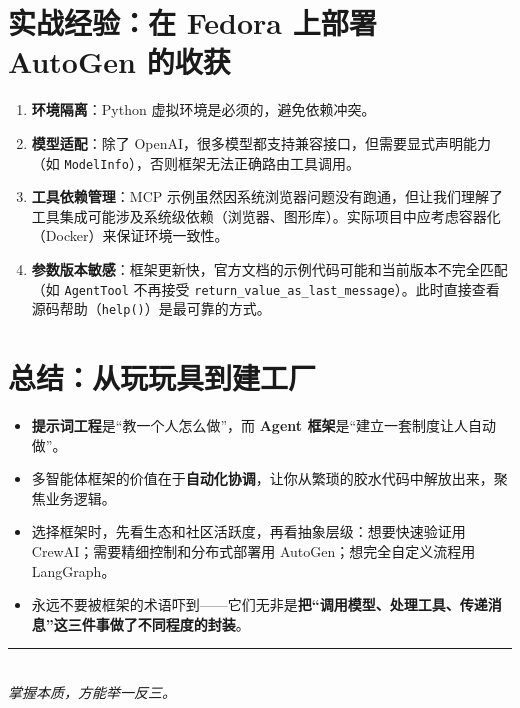\documentclass[11pt,a4paper]{article}
\begin{document}
\section{实战经验：在 Fedora 上部署 AutoGen 的收获}
\begin{enumerate}
    \item \textbf{环境隔离}：Python 虚拟环境是必须的，避免依赖冲突。
    \item \textbf{模型适配}：除了 OpenAI，很多模型都支持兼容接口，但需要显式声明能力（如 \texttt{ModelInfo}），否则框架无法正确路由工具调用。
    \item \textbf{工具依赖管理}：MCP 示例虽然因系统浏览器问题没有跑通，但让我们理解了工具集成可能涉及系统级依赖（浏览器、图形库）。实际项目中应考虑容器化（Docker）来保证环境一致性。
    \item \textbf{参数版本敏感}：框架更新快，官方文档的示例代码可能和当前版本不完全匹配（如 \texttt{AgentTool} 不再接受 \texttt{return\_value\_as\_last\_message}）。此时直接查看源码帮助（\texttt{help()}）是最可靠的方式。
\end{enumerate}

\section{总结：从玩玩具到建工厂}
\begin{itemize}
    \item \textbf{提示词工程}是“教一个人怎么做”，而 \textbf{Agent 框架}是“建立一套制度让人自动做”。
    \item 多智能体框架的价值在于\textbf{自动化协调}，让你从繁琐的胶水代码中解放出来，聚焦业务逻辑。
    \item 选择框架时，先看生态和社区活跃度，再看抽象层级：想要快速验证用 CrewAI；需要精细控制和分布式部署用 AutoGen；想完全自定义流程用 LangGraph。
    \item 永远不要被框架的术语吓到——它们无非是\textbf{把“调用模型、处理工具、传递消息”这三件事做了不同程度的封装}。
\end{itemize}

\vspace{1cm}
\begin{center}
\rule{0.5\textwidth}{0.4pt}\\
\textit{掌握本质，方能举一反三。}
\end{center}
\end{document}
